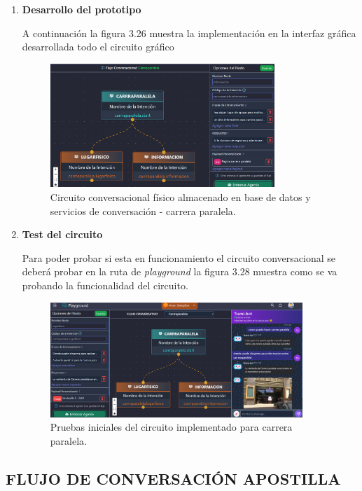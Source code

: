 \documentclass[letter, openright, 12pt]{book}
\begin{document}
{\begin{enumerate}[label=(\alph*)]
	\item \textbf{Desarrollo del prototipo}
	\par A continuación la figura 3.26 muestra la implementación en la interfaz gráfica desarrollada todo el circuito gráfico
	\begin{figure}[H]
\centering
\includegraphics[width=0.8\textwidth]{figura3_27}
 \caption{Circuito conversacional físico almacenado en base de datos y servicios de conversación - carrera paralela.  }
\label{fig:figura3_27}
\end{figure}

\item \textbf{Test del circuito}
\par Para poder probar si esta en funcionamiento el circuito conversacional se deberá probar en la ruta de {\it playground} la figura 3.28 muestra como se va probando la funcionalidad del circuito.
	\begin{figure}[H]
\centering
\includegraphics[width=0.9\textwidth]{figura3_28}
 \caption{Pruebas iniciales del circuito implementado para carrera paralela.  }
\label{fig:figura3_28}
\end{figure}


\end{enumerate}

\subsection{FLUJO DE CONVERSACIÓN APOSTILLA}

}
\end{document}
